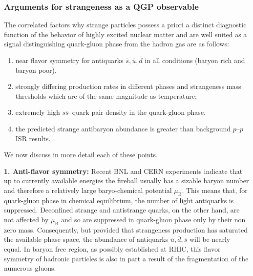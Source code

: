 \begin{mdframed}[linecolor=gray,roundcorner=12pt,backgroundcolor=Dandelion!15,linewidth=1pt,leftmargin=0cm,rightmargin=0cm,topline=true,bottomline=true,skipabove=12pt]
\subsubsection*{\bf Arguments for strangeness as a QGP observable}
The correlated factors why strange particles possess a priori a distinct diagnostic function of the behavior of highly excited nuclear matter and are well suited as a signal distinguishing quark-gluon phase from the hadron gas are as follows:
\begin{enumerate}
\item near flavor symmetry for antiquarks $\bar s, \bar u, \bar d$ in all conditions (baryon rich and baryon poor), 
\item strongly differing production rates in different phases and strangeness mass thresholds which are of the same magnitude as temperature;
\item extremely high $s\bar s$--quark pair density in the quark-gluon phase.
\item the predicted strange antibaryon abundance is greater than background $p$--$p$ ISR results.
\end{enumerate}
We now discuss in more detail each of these points. 

{\bf 1. Anti-flavor symmetry:} Recent BNL and CERN experiments indicate that up to currently available energies the fireball usually has a sizable baryon number and therefore a relatively large baryo-chemical potential $\mu_\mathrm{B}$. This means that, for quark-gluon phase in chemical equilibrium, the number of light antiquarks is suppressed. Deconfined strange and antistrange quarks, on the other hand, are not affected by $\mu_\mathrm{B}$ and so are suppressed in quark-gluon phase only by their non zero mass. Consequently, but provided that strangeness production has saturated the available phase space, the abundance of antiquarks $\bar u, \bar d, \bar s$ will be nearly equal. In baryon free region, as possibly established at RHIC, this flavor symmetry of hadronic particles is also in part a result of the fragmentation of the numerous gluons.  


\end{mdframed}
